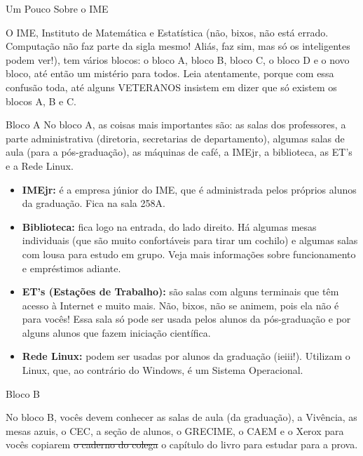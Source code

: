\begin{secao}{Um Pouco Sobre o IME}

O IME, Instituto de Matemática e Estatística (não, bixos, não está errado. 
Computação não faz parte da sigla mesmo! Aliás, faz sim, mas só os inteligentes 
podem ver!), tem vários blocos: o bloco A, bloco B, bloco C, o bloco D e o 
novo bloco, até então um mistério para todos. Leia atentamente, porque com essa 
confusão toda, até alguns VETERANOS insistem em dizer que só existem os blocos A, B e C.

\begin{subsecao}{Bloco A}
No bloco A, as coisas mais importantes são: as salas dos professores, a parte
administrativa (diretoria, secretarias de departamento), algumas salas de aula
(para a pós-graduação), as máquinas de café, a IMEjr, a biblioteca, as ET's e
a Rede Linux.

\begin{itemize}

\item {\bf IMEjr:} é a empresa júnior do IME, que é administrada pelos próprios
alunos da graduação. Fica na sala 258A.

\item {\bf Biblioteca:} fica logo na entrada, do lado direito. Há algumas mesas
individuais (que são muito confortáveis para tirar um cochilo) e algumas salas
com lousa para estudo em grupo. Veja mais informações sobre funcionamento e empréstimos adiante.

\item {\bf ET's (Estações de Trabalho):} são salas com alguns terminais que têm
acesso à Internet e muito mais. Não, bixos, não se animem, pois ela não é para
vocês! Essa sala só pode ser usada pelos alunos da pós-graduação e por alguns
alunos que fazem iniciação científica.

\item {\bf Rede Linux:} podem ser usadas por alunos da graduação (ieiii!).
Utilizam o Linux, que, ao contrário do Windows, é um Sistema Operacional.

\end{itemize}
\end{subsecao}

\begin{subsecao}{Bloco B}

No bloco B, vocês devem conhecer as salas de aula (da graduação), a Vivência, as
mesas azuis, o CEC, a seção de alunos, o GRECIME, o CAEM e o Xerox para vocês
copiarem \sout{o caderno do colega} o capítulo do livro para estudar para a prova.


\end{subsecao}
\end{secao}
